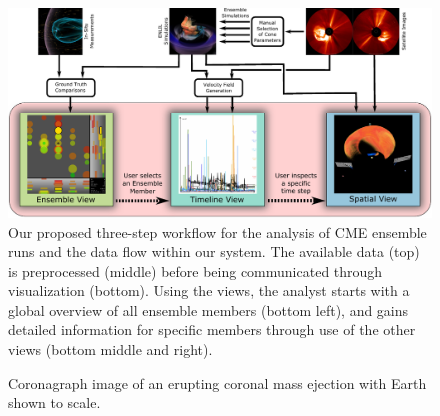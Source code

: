 \documentclass[journal]{vgtc}                %
\begin{document}
\begin{figure}
\centering
\includegraphics[width=\linewidth]{figures/workflow.pdf}
\caption{Our proposed three-step workflow for the analysis of CME ensemble runs and the data flow within our system. The available data (top) is preprocessed (middle) before being communicated through visualization (bottom). Using the views, the analyst starts with a global overview of all ensemble members (bottom left), and gains detailed information for specific members through use of the other views (bottom middle and right).}
\label{fig:workflow}
\end{figure}

\begin{figure}[!b]
\centering
\caption{Coronagraph image of an erupting coronal mass ejection with Earth shown to scale.}
\label{fig:cme}
\end{figure}
\end{document}
